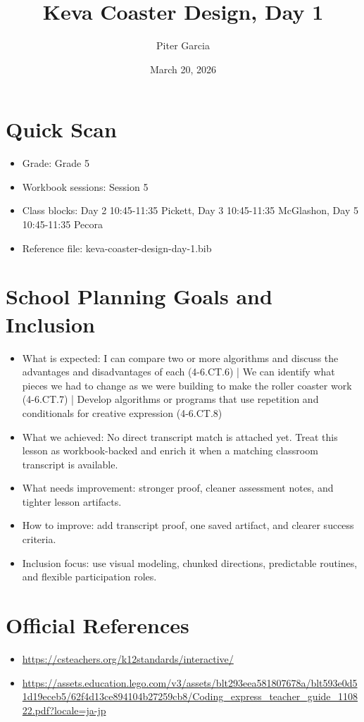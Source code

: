\documentclass[11pt]{article}
\title{Keva Coaster Design, Day 1}
\author{Piter Garcia}
\date{March 20, 2026}
\begin{document}
    \maketitle
    \section*{Quick Scan}
    \begin{itemize}[leftmargin=*]
    \item Grade: Grade 5
    \item Workbook sessions: Session 5
    \item Class blocks: Day 2 10:45-11:35 Pickett, Day 3 10:45-11:35 McGlashon, Day 5 10:45-11:35 Pecora
    \item Reference file: keva-coaster-design-day-1.bib
    \end{itemize}
    \section*{School Planning Goals and Inclusion}
    \begin{itemize}[leftmargin=*]
    \item What is expected: I can compare two or more algorithms and discuss the advantages and disadvantages of each (4-6.CT.6) | We can identify what pieces we had to change as we were building to make the roller coaster work (4-6.CT.7) | Develop algorithms or programs that use repetition and conditionals for creative expression (4-6.CT.8)
    \item What we achieved: No direct transcript match is attached yet. Treat this lesson as workbook-backed and enrich it when a matching classroom transcript is available.
    \item What needs improvement: stronger proof, cleaner assessment notes, and tighter lesson artifacts.
    \item How to improve: add transcript proof, one saved artifact, and clearer success criteria.
    \item Inclusion focus: use visual modeling, chunked directions, predictable routines, and flexible participation roles.
    \end{itemize}
    \section*{Official References}
    \begin{itemize}[leftmargin=*]
    \item \url{https://csteachers.org/k12standards/interactive/}
\item \url{https://assets.education.lego.com/v3/assets/blt293eea581807678a/blt593e0d51d19eceb5/62f4d13ce894104b27259cb8/Coding_express_teacher_guide_110822.pdf?locale=ja-jp}

    \end{itemize}
    
\end{document}
